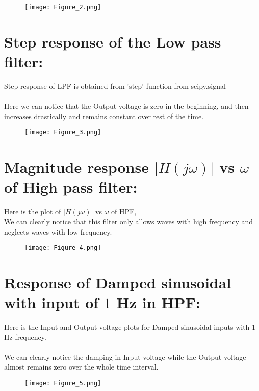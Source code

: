 \documentclass[12pt]{article}
\begin{document}
\begin{figure}[h!]
\centering
\texttt{[image: Figure\_2.png]}
\end{figure}

\newpage
\section*{Step response of the Low pass filter:}

Step response of LPF is obtained from 'step' function from scipy.signal\\\\
Here we can notice that the Output voltage is zero in the beginning, and then increases drastically and remains constant over rest of the time.

\begin{figure}[h!]
\centering
\texttt{[image: Figure\_3.png]}
\label{fig:exemplo}
\end{figure}


\newpage
\section*{Magnitude response $|H(j\omega)|$ vs $\omega$ of High pass filter:}

Here is the plot of $|H(j\omega)|$ vs $\omega$ of HPF,\\
We can clearly notice that this filter only allows waves with high frequency and neglects waves with low frequency.

\begin{figure}[h!]
\centering
\texttt{[image: Figure\_4.png]}
\label{fig:exemplo}
\end{figure}

\newpage
\section*{Response of Damped sinusoidal with input of $1$ Hz in HPF:}

Here is the Input and Output voltage plots for Damped sinusoidal inputs with 1 Hz frequency.\\\\
We can clearly notice the damping in Input voltage while the Output voltage almost remains zero over the whole time interval.

\begin{figure}[h!]
\centering
\texttt{[image: Figure\_5.png]}
\label{fig:exemplo}
\end{figure}
\end{document}
